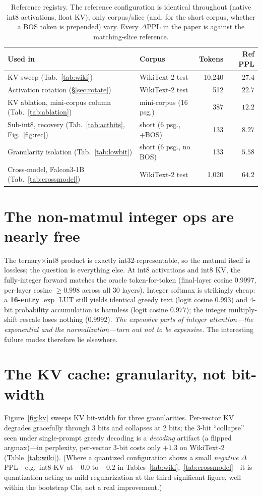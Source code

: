 \documentclass[11pt]{article}
\begin{document}
\begin{table}[t]\centering\small
\caption{Reference registry. The reference configuration is identical throughout
(native int8 activations, float KV); only corpus/slice (and, for the short corpus,
whether a BOS token is prepended) vary. Every $\Delta$PPL in the paper is against the
matching-slice reference.}
\label{tab:registry}
\begin{tabular}{llrr}
\toprule
Used in & Corpus & Tokens & Ref PPL\\
\midrule
KV sweep (Tab.~\ref{tab:wiki}) & WikiText-2 test & 10{,}240 & $27.4$\\
Activation rotation (\S\ref{sec:rotate}) & WikiText-2 test & 512 & $22.7$\\
KV ablation, mini-corpus column (Tab.~\ref{tab:ablation}) & mini-corpus (16 psg.) & 387 & $12.2$\\
Sub-int8, recovery (Tab.~\ref{tab:actbits}, Fig.~\ref{fig:rec}) & short (6 psg., +BOS) & 133 & $8.27$\\
Granularity isolation (Tab.~\ref{tab:lowbit}) & short (6 psg., no BOS) & 133 & $5.58$\\
Cross-model, Falcon3-1B (Tab.~\ref{tab:crossmodel}) & WikiText-2 test & 1{,}020 & $64.2$\\
\bottomrule
\end{tabular}
\end{table}

\section{The non-matmul integer ops are nearly free}
\label{sec:cheap}
The ternary$\times$int8 product is exactly int32-representable, so the matmul itself
is lossless; the question is everything else. At int8 activations and int8 KV, the
fully-integer forward matches the oracle token-for-token (final-layer cosine
$0.9997$, per-layer cosine $\geq0.998$ across all 30 layers). Integer softmax is
strikingly cheap: a \textbf{16-entry} $\exp$ LUT still yields identical greedy text
(logit cosine $0.993$) and 4-bit probability accumulation is harmless (logit cosine
$0.977$); the integer multiply-shift rescale loses nothing ($0.9992$). \emph{The
expensive parts of integer attention---the exponential and the normalization---turn
out not to be expensive.} The interesting failure modes therefore lie elsewhere.

\section{The KV cache: granularity, not bit-width}
\label{sec:kv}
Figure~\ref{fig:kv} sweeps KV bit-width for three granularities. Per-vector KV
degrades gracefully through 3 bits and collapses at 2 bits; the 3-bit ``collapse''
seen under single-prompt greedy decoding is a \emph{decoding} artifact (a flipped
argmax)---in perplexity, per-vector 3-bit costs only $+1.3$ on WikiText-2
(Table~\ref{tab:wiki}). (Where a quantized
configuration shows a small \emph{negative} $\Delta$PPL---e.g.\ int8 KV at
$-0.0$ to $-0.2$ in Tables~\ref{tab:wiki},~\ref{tab:crossmodel}---it is quantization
acting as mild regularization at the third significant figure, well within the
bootstrap CIs, not a real improvement.)
\end{document}
